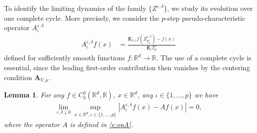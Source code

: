 \documentclass[10pt]{article}
\newcommand{\E}{\mathbf{E}}
\newcommand{\1}{1\!\!\!\;{\rm I}}
\theoremstyle{plain}
\newtheorem{lem}[thm]{Lemma}
\theoremstyle{definition}
\newcommand{\e}{\varepsilon}
\newcommand{\ba}{\begin{equation}\begin{aligned}}
\newcommand{\ea}{\end{aligned}\end{equation}}
\newcommand{\bR}{\mathbb{R}}
\numberwithin{equation}{section}
\begin{document}
To identify the limiting dynamics of the family $\{Z^{\e,\delta}\}$, we study its evolution over one complete cycle.
More precisely, we consider the $p$-step pseudo-characteristic operator $A_{\iota}^{\e,\delta}$
\ba
A_\iota^{\e,\delta }f(x)&=\frac{\E_{x,\iota} f(Z^{\e,\delta}_{T^\e_{p}}) - f(x)}{\E_\iota T_p^\e }
\ea
defined for sufficiently smooth functions $f\colon \bR^d \to \bR$.
The use of a complete cycle is essential, since the leading first-order contribution then vanishes by the centering condition
$\mathbf{A}_{V,\mu}$.



\begin{lem}
\label{l:A}
For any $f\in C^3_b(\bR^d,\bR)$,
$x\in\bR^d$, any $\iota\in \{1,\dots,p\}$ we have
\ba
\label{e:Aiota}
\lim_{\e,\delta \downarrow 0} \sup_{x\in\mathbb R^d,\iota\in\{1,\dots,p\}}
|A_\iota^{\e,\delta }f(x) -A f(x)|=0,
\ea
where the operator $A$ is defined in \eqref{e:opA}.
\end{lem}
\end{document}
